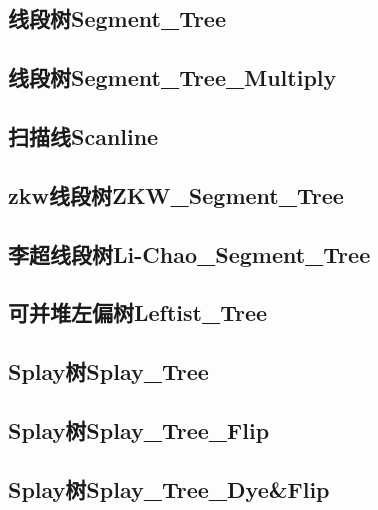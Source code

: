 \documentclass[10pt,a4paper]{article}
\begin{document}
\subsection{线段树Segment\_Tree}

\subsection{线段树Segment\_Tree\_Multiply}

\subsection{扫描线Scanline}

\subsection{zkw线段树ZKW\_Segment\_Tree}

\subsection{李超线段树Li-Chao\_Segment\_Tree}

\subsection{可并堆左偏树Leftist\_Tree}

\subsection{Splay树Splay\_Tree}

\subsection{Splay树Splay\_Tree\_Flip}

\subsection{Splay树Splay\_Tree\_Dye\&Flip}

% 

\newpage
\end{document}
